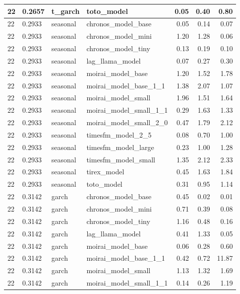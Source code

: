{\begin{tabular}{llllrrr}
\midrule
22 & 0.2657 & t\_garch & toto\_model & 0.05 & 0.40 & 0.80 \\
\midrule
22 & 0.2933 & seasonal & chronos\_model\_base & 0.05 & 0.14 & 0.07 \\
\midrule
22 & 0.2933 & seasonal & chronos\_model\_mini & 1.20 & 1.28 & 0.06 \\
\midrule
22 & 0.2933 & seasonal & chronos\_model\_tiny & 0.13 & 0.19 & 0.10 \\
\midrule
22 & 0.2933 & seasonal & lag\_llama\_model & 0.07 & 0.27 & 0.30 \\
\midrule
22 & 0.2933 & seasonal & moirai\_model\_base & 1.20 & 1.52 & 1.78 \\
\midrule
22 & 0.2933 & seasonal & moirai\_model\_base\_1\_1 & 1.38 & 2.07 & 1.07 \\
\midrule
22 & 0.2933 & seasonal & moirai\_model\_small & 1.96 & 1.51 & 1.64 \\
\midrule
22 & 0.2933 & seasonal & moirai\_model\_small\_1\_1 & 0.29 & 1.63 & 1.33 \\
\midrule
22 & 0.2933 & seasonal & moirai\_model\_small\_2\_0 & 0.47 & 1.79 & 2.12 \\
\midrule
22 & 0.2933 & seasonal & timesfm\_model\_2\_5 & 0.08 & 0.70 & 1.00 \\
\midrule
22 & 0.2933 & seasonal & timesfm\_model\_large & 0.23 & 1.00 & 1.28 \\
\midrule
22 & 0.2933 & seasonal & timesfm\_model\_small & 1.35 & 2.12 & 2.33 \\
\midrule
22 & 0.2933 & seasonal & tirex\_model & 0.45 & 1.63 & 1.84 \\
\midrule
22 & 0.2933 & seasonal & toto\_model & 0.31 & 0.95 & 1.14 \\
\midrule
22 & 0.3142 & garch & chronos\_model\_base & 0.45 & 0.02 & 0.01 \\
\midrule
22 & 0.3142 & garch & chronos\_model\_mini & 0.71 & 0.39 & 0.08 \\
\midrule
22 & 0.3142 & garch & chronos\_model\_tiny & 1.16 & 0.48 & 0.16 \\
\midrule
22 & 0.3142 & garch & lag\_llama\_model & 0.41 & 1.33 & 0.05 \\
\midrule
22 & 0.3142 & garch & moirai\_model\_base & 0.06 & 0.28 & 0.60 \\
\midrule
22 & 0.3142 & garch & moirai\_model\_base\_1\_1 & 0.42 & 0.72 & 11.87 \\
\midrule
22 & 0.3142 & garch & moirai\_model\_small & 1.13 & 1.32 & 1.69 \\
\midrule
22 & 0.3142 & garch & moirai\_model\_small\_1\_1 & 0.14 & 0.26 & 1.19 \\

\end{tabular}}
